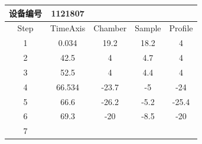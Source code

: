 \documentclass[UTF8,10pt,a4paper,fontset=fandol]{ctexart}
\newcommand{\fieldvalue}[1]{#1}
\begin{document}
\begin{center}
\begin{tabular}{|c|c|c|c|c|}
\hline
设备编号 &
\fieldvalue{1121807}
& & &\\
\hline
Step & TimeAxis & Chamber & Sample & Profile\\
\hline
1 &
\fieldvalue{0.034} &
\fieldvalue{19.2} &
\fieldvalue{18.2} &
\fieldvalue{4}\\
\hline
2 &
\fieldvalue{42.5} &
\fieldvalue{4} &
\fieldvalue{4.7} &
\fieldvalue{4}\\
\hline
3 &
\fieldvalue{52.5} &
\fieldvalue{4} &
\fieldvalue{4.4} &
\fieldvalue{4}\\
\hline
4 &
\fieldvalue{66.534} &
\fieldvalue{-23.7} &
\fieldvalue{-5} &
\fieldvalue{-24}\\
\hline
5 &
\fieldvalue{66.6} &
\fieldvalue{-26.2} &
\fieldvalue{-5.2} &
\fieldvalue{-25.4}\\
\hline
6 &
\fieldvalue{69.3} &
\fieldvalue{-20} &
\fieldvalue{-8.5} &
\fieldvalue{-20}\\
\hline
7 &

\end{tabular}
\end{center}
\end{document}
